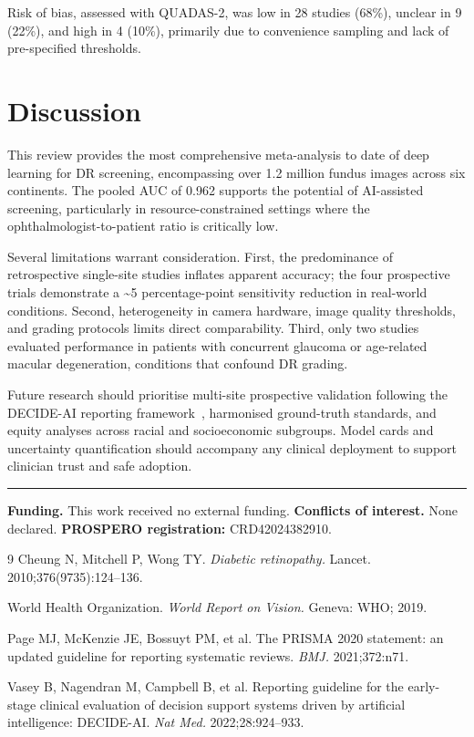 \documentclass[11pt,a4paper]{article}
\begin{document}
Risk of bias, assessed with QUADAS-2, was low in 28 studies (68\%), unclear in 9 (22\%),
and high in 4 (10\%), primarily due to convenience sampling and lack of pre-specified
thresholds.

\section{Discussion}

This review provides the most comprehensive meta-analysis to date of deep learning for
DR screening, encompassing over 1.2 million fundus images across six continents.
The pooled AUC of 0.962 supports the potential of AI-assisted screening, particularly in
resource-constrained settings where the ophthalmologist-to-patient ratio is critically low.

Several limitations warrant consideration. First, the predominance of retrospective
single-site studies inflates apparent accuracy; the four prospective trials demonstrate
a \textasciitilde{}5 percentage-point sensitivity reduction in real-world conditions.
Second, heterogeneity in camera hardware, image quality thresholds, and grading protocols
limits direct comparability. Third, only two studies evaluated performance in patients
with concurrent glaucoma or age-related macular degeneration, conditions that confound
DR grading.

Future research should prioritise multi-site prospective validation following the
DECIDE-AI reporting framework~\cite{Vasey2022}, harmonised ground-truth standards, and
equity analyses across racial and socioeconomic subgroups. Model cards and uncertainty
quantification should accompany any clinical deployment to support clinician trust
and safe adoption.

\vspace{3mm}
{\color{lightrule}\rule{\linewidth}{0.4pt}}

\textbf{Funding.} This work received no external funding.
\textbf{Conflicts of interest.} None declared.
\textbf{PROSPERO registration:} CRD42024382910.

\begin{thebibliography}{9}
\setlength{\itemsep}{2pt}
  Cheung N, Mitchell P, Wong TY.
  \textit{Diabetic retinopathy.}
  Lancet. 2010;376(9735):124–136.

  World Health Organization.
  \textit{World Report on Vision.}
  Geneva: WHO; 2019.

  Page MJ, McKenzie JE, Bossuyt PM, et al.
  The PRISMA 2020 statement: an updated guideline for reporting systematic reviews.
  \textit{BMJ.} 2021;372:n71.

  Vasey B, Nagendran M, Campbell B, et al.
  Reporting guideline for the early-stage clinical evaluation of decision support
  systems driven by artificial intelligence: DECIDE-AI.
  \textit{Nat Med.} 2022;28:924–933.
\end{thebibliography}
\end{document}
